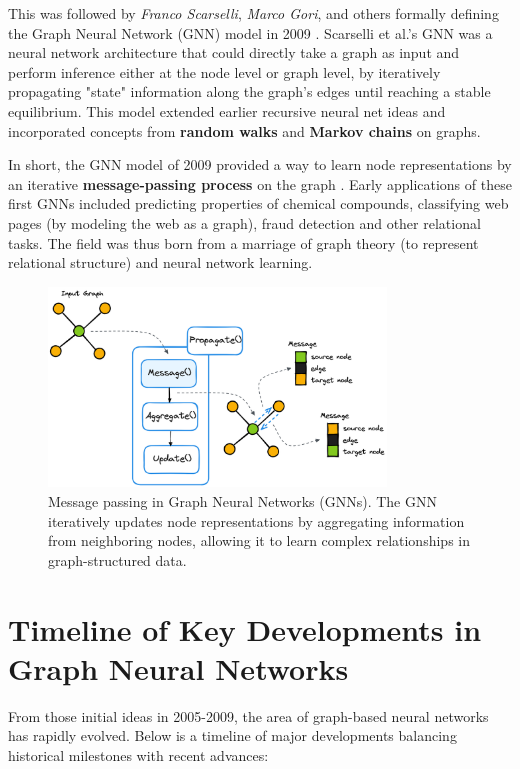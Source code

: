 \documentclass{article}
\begin{document}
This was followed by \textit{Franco Scarselli}, \textit{Marco Gori}, and others formally defining the Graph Neural Network (GNN) model in 2009 \cite{scarselli2009graph}.
Scarselli et al.'s GNN was a neural network architecture that could directly take a graph as input and perform inference either at the node level or graph level, by iteratively propagating "state" information along the graph's edges until reaching a stable equilibrium.
This model extended earlier recursive neural net ideas and incorporated concepts from \textbf{random walks} and \textbf{Markov chains} on graphs.

In short, the GNN model of 2009 provided a way to learn node representations by an iterative \textbf{message-passing process} on the graph \cite{rizvi2022fimp}.
Early applications of these first GNNs included predicting properties of chemical compounds, classifying web pages (by modeling the web as a graph), fraud detection and other relational tasks.
The field was thus born from a marriage of graph theory (to represent relational structure) and neural network learning.

\begin{figure}[ht]
      \centering
      \includegraphics[width=0.8\textwidth]{../assets/gnn-message-passing.png}
      \caption{Message passing in Graph Neural Networks (GNNs).
            The GNN iteratively updates node representations by aggregating information from neighboring nodes, allowing it to learn complex relationships in graph-structured data.}
      \label{fig:gnn-message-passing}
\end{figure}

\section{Timeline of Key Developments in Graph Neural Networks}

From those initial ideas in 2005-2009, the area of graph-based neural networks has rapidly evolved.
Below is a timeline of major developments balancing historical milestones with recent advances:
\end{document}
